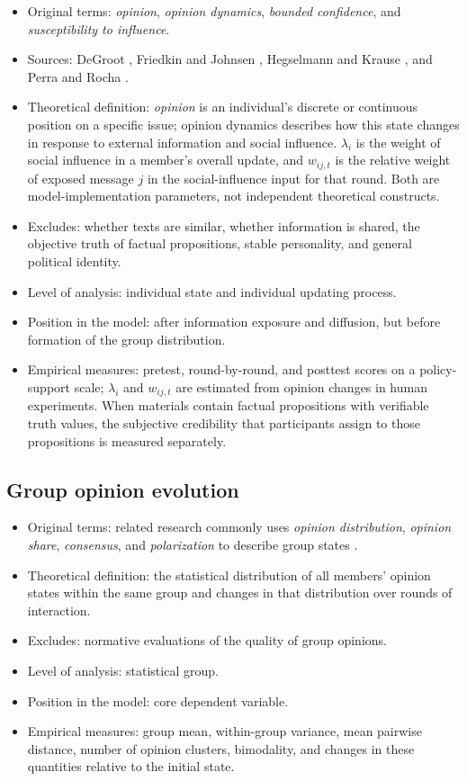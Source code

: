 \documentclass[11pt,a4paper]{article}
\newcommand{\term}[1]{\textit{#1}}
\begin{document}
\begin{itemize}
\item Original terms: \term{opinion}, \term{opinion dynamics}, \term{bounded confidence}, and \term{susceptibility to influence}.
\item Sources: DeGroot \cite{degroot1974}, Friedkin and Johnsen \cite{friedkin1990}, Hegselmann and Krause \cite{hegselmann2002}, and Perra and Rocha \cite{perra2019}.
\item Theoretical definition: \term{opinion} is an individual's discrete or continuous position on a specific issue; opinion dynamics describes how this state changes in response to external information and social influence. $\lambda_i$ is the weight of social influence in a member's overall update, and $w_{ij,t}$ is the relative weight of exposed message $j$ in the social-influence input for that round. Both are model-implementation parameters, not independent theoretical constructs.
\item Excludes: whether texts are similar, whether information is shared, the objective truth of factual propositions, stable personality, and general political identity.
\item Level of analysis: individual state and individual updating process.
\item Position in the model: after information exposure and diffusion, but before formation of the group distribution.
\item Empirical measures: pretest, round-by-round, and posttest scores on a policy-support scale; $\lambda_i$ and $w_{ij,t}$ are estimated from opinion changes in human experiments. When materials contain factual propositions with verifiable truth values, the subjective credibility that participants assign to those propositions is measured separately.
\end{itemize}

\subsection{Group opinion evolution}

\begin{itemize}
\item Original terms: related research commonly uses \term{opinion distribution}, \term{opinion share}, \term{consensus}, and \term{polarization} to describe group states \cite{perra2019,hegselmann2002}.
\item Theoretical definition: the statistical distribution of all members' opinion states within the same group and changes in that distribution over rounds of interaction.
\item Excludes: normative evaluations of the quality of group opinions.
\item Level of analysis: statistical group.
\item Position in the model: core dependent variable.
\item Empirical measures: group mean, within-group variance, mean pairwise distance, number of opinion clusters, bimodality, and changes in these quantities relative to the initial state.
\end{itemize}
\end{document}
